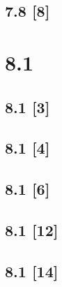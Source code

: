 \documentclass{article}
\begin{document}
\subsection*{7.8 [8]}

\newpage

\section*{8.1}
\setcounter{equation}{0}

\subsection*{8.1 [3]}
\subsection*{8.1 [4]}
\subsection*{8.1 [6]}
\subsection*{8.1 [12]}
\subsection*{8.1 [14]}
\end{document}
